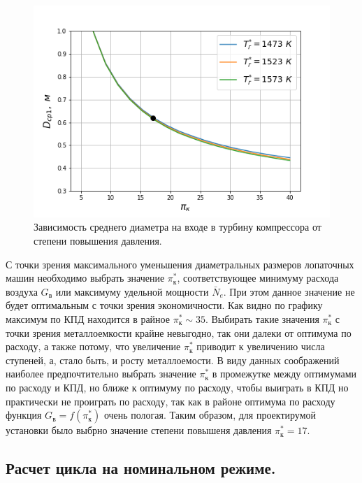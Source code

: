\documentclass[a4paper,12pt]{article}
\begin{document}
    \begin{figure}[h!]
        \centering
        \includegraphics[scale=0.8]{../plots/cycle_D_av1.png}
        \caption{Зависимость среднего диаметра на входе в турбину компрессора от степени повышения давления.}
        \label{cycle_D_av1}
    \end{figure}

    С точки зрения максимального уменьшения диаметральных размеров лопаточных машин необходимо выбрать
    значение $\pi_к^*$, соответствующее минимуму расхода воздуха $G_в$ или максимуму удельной мощности $\bar{N}_e$.
    При этом данное значение не будет оптимальным с точки зрения экономичности.
    Как видно по графику максимум по КПД находится в райное $\pi_к^* \sim 35$.
    Выбирать такие значения $\pi_к^*$ с точки зрения металлоемкости крайне невыгодно, так они далеки от оптимума
    по расходу, а также потому, что увеличение $\pi_к^*$ приводит к увеличению числа ступеней, а, стало быть, и
    росту металлоемости.
    В виду данных соображений наиболее предпочтительно выбрать значение $\pi_к^*$ в промежутке между оптимумами
    по расходу и КПД, но ближе к оптимуму по расходу, чтобы выиграть в КПД но практически не проиграть по расходу,
    так как в районе оптимума по расходу функция $G_в = f(\pi_к^*)$ очень пологая.
    Таким образом, для проектирумой установки было выбрно значение степени повышеня давления $\pi_к^* = 17$.

    \subsection{Расчет цикла на номинальном режиме.}
%    
\end{document}
